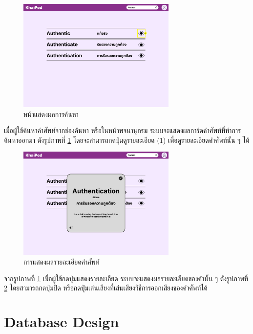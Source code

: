 \documentclass[12pt,oneside,openright,a4paper]{cpe-thai-project}
\begin{document}
\begin{figure}[!h]\centering
	\includegraphics[width=0.7\textwidth, keepaspectratio=true]{image/chap3/ui/dict/Dictionary - Search Word.png}
	\caption{หน้าแสดงผลการค้นหา}\label{fig:UI_DictionarySearch}
\end{figure}
\hspace{1cm}
เมื่อผู้ใช้ค้นหาคำศัพท์จากช่องค้นหา หรือในหน้าพจนานุกรม ระบบจะแสดงผลการ์ดคำศัพท์ที่ทำการค้นหาออกมา
ดังรูปภาพที่ \ref{fig:UI_DictionarySearch} โดยจะสามารถกดปุ่มดูรายละเอียด (1) เพื่อดูรายละเอียดคำศัพท์นั้น ๆ ได้

\pagebreak
\begin{figure}[!h]\centering
	\includegraphics[width=0.7\textwidth, keepaspectratio=true]{image/chap3/ui/dict/Dictionary - View Word.png}
	\caption{การแสดงผลรายละเอียดคำศัพท์}\label{fig:UI_DictionaryView}
\end{figure}
\hspace{1cm}
จากรูปภาพที่ \ref{fig:UI_DictionarySearch} เมื่อผู้ใช้กดปุ่มแสดงรายละเอียด ระบบจะแสดงผลรายละเอียดของคำนั้น ๆ ดังรูปภาพที่ \ref{fig:UI_DictionaryView}
โดยสามารถกดปุ่มปิด หรือกดปุ่มเล่นเสียงที่เล่นเสียงวิธีการออกเสียงของคำศัพท์ได้

\pagebreak
\section{Database Design}
\end{document}
